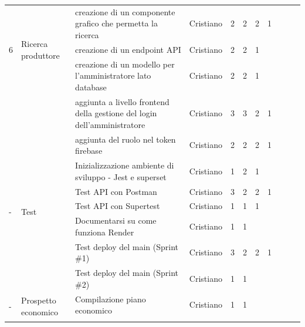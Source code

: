 \begin{longtable}{p{0.5cm}|p{2.7cm}|p{4.5cm}|p{1.7cm}|p{1.5cm}|p{0.2cm}|p{0.2cm}|p{0.2cm}|p{0.2cm}|p{0.2cm}|p{0.2cm}}
    

    

    \multirow{3}{0.2cm}{6} & \multirow{3}{0.2cm}{Ricerca produttore}
    & creazione di un componente grafico che permetta la ricerca & Cristiano & 2 & 2& 2& 1& & & \\
    && creazione di un endpoint API & Cristiano & 2 & 2& 1& & & & \\
    \hline

    \multirow{5}{0.2cm}{24} & \multirow{5}{0.2cm}{Gestione account}
    & creazione di un modello per l'amministratore lato database & Cristiano & 2 & 2 & 1& & & & \\
    && aggiunta a livello frontend della gestione del login dell'amministratore & Cristiano & 3 & 3& 2& 1& & & \\
    && aggiunta del ruolo nel token firebase & Cristiano & 2 & 2& 2& 1& & & \\
    \hline

    \multirow{5}{0.2cm}{-} & \multirow{5}{0.2cm}{Test}
    & Inizializzazione ambiente di sviluppo - Jest e superset & Cristiano & 1 & 2 & 1& & & & \\
    && Test API con Postman & Cristiano & 3 & 2& 2& 1& & & \\
    && Test API con Supertest & Cristiano & 1 & 1& 1& & & & \\
    \hline

    \multirow{5}{0.2cm}{-} & \multirow{5}{0.2cm}{Deploy applicazione}
    & Documentarsi su come funziona Render & Cristiano & 1 & 1 & & & & & \\
    && Test deploy del main (Sprint \#1) & Cristiano & 3 & 2& 2& 1& & & \\
    && Test deploy del main (Sprint \#2) & Cristiano & 1 & 1& & & & & \\
    \hline

    \multirow{3}{0.2cm}{-} & \multirow{3}{0.2cm}{Prospetto economico}
    & Compilazione piano economico & Cristiano & 1 & 1 & & & & & \\
    &  &  &  &  & & & & & \\
    \hline


\end{longtable}
